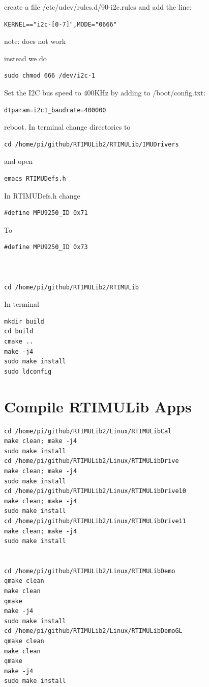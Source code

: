 create a file /etc/udev/rules.d/90-i2c.rules and add the line:

\begin{verbatim}
KERNEL=="i2c-[0-7]",MODE="0666"
\end{verbatim}

note: does not work

instead we do

\begin{verbatim}
sudo chmod 666 /dev/i2c-1 
\end{verbatim}

Set the I2C bus speed to 400KHz by adding to /boot/config.txt:

\begin{verbatim}
dtparam=i2c1_baudrate=400000
\end{verbatim}

reboot. In terminal change directories to

\begin{verbatim}
cd /home/pi/github/RTIMULib2/RTIMULib/IMUDrivers
\end{verbatim}

and open

\begin{verbatim}
emacs RTIMUDefs.h
\end{verbatim}

In RTIMUDefs.h change

\begin{verbatim}
#define MPU9250_ID 0x71
\end{verbatim}

To

\begin{verbatim}
#define MPU9250_ID 0x73



cd /home/pi/github/RTIMULib2/RTIMULib
\end{verbatim}

In terminal

\begin{verbatim}
mkdir build
cd build
cmake ..
make -j4
sudo make install
sudo ldconfig
\end{verbatim}

\section{Compile RTIMULib Apps}\label{compile-rtimulib-apps}

\begin{verbatim}
cd /home/pi/github/RTIMULib2/Linux/RTIMULibCal
make clean; make -j4
sudo make install
cd /home/pi/github/RTIMULib2/Linux/RTIMULibDrive
make clean; make -j4
sudo make install
cd /home/pi/github/RTIMULib2/Linux/RTIMULibDrive10
make clean; make -j4
sudo make install
cd /home/pi/github/RTIMULib2/Linux/RTIMULibDrive11
make clean; make -j4
sudo make install


cd /home/pi/github/RTIMULib2/Linux/RTIMULibDemo    
qmake clean
make clean
qmake
make -j4
sudo make install
cd /home/pi/github/RTIMULib2/Linux/RTIMULibDemoGL
qmake clean
make clean
qmake
make -j4
sudo make install
\end{verbatim}

